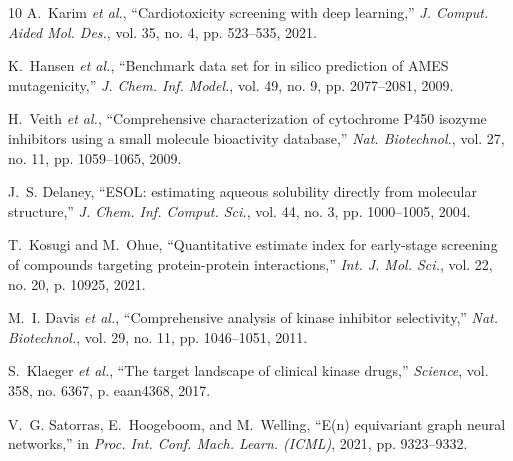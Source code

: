 \documentclass[journal]{IEEEtran}
\begin{document}
\begin{thebibliography}{10}
A.~Karim \emph{et al.}, ``Cardiotoxicity screening with deep learning,'' \emph{J. Comput. Aided Mol. Des.}, vol. 35, no. 4, pp. 523--535, 2021.

K.~Hansen \emph{et al.}, ``Benchmark data set for in silico prediction of AMES mutagenicity,'' \emph{J. Chem. Inf. Model.}, vol. 49, no. 9, pp. 2077--2081, 2009.

H.~Veith \emph{et al.}, ``Comprehensive characterization of cytochrome P450 isozyme inhibitors using a small molecule bioactivity database,'' \emph{Nat. Biotechnol.}, vol. 27, no. 11, pp. 1059--1065, 2009.

J.~S. Delaney, ``ESOL: estimating aqueous solubility directly from molecular structure,'' \emph{J. Chem. Inf. Comput. Sci.}, vol. 44, no. 3, pp. 1000--1005, 2004.

T.~Kosugi and M.~Ohue, ``Quantitative estimate index for early-stage screening of compounds targeting protein-protein interactions,'' \emph{Int. J. Mol. Sci.}, vol. 22, no. 20, p. 10925, 2021.

M.~I. Davis \emph{et al.}, ``Comprehensive analysis of kinase inhibitor selectivity,'' \emph{Nat. Biotechnol.}, vol. 29, no. 11, pp. 1046--1051, 2011.

S.~Klaeger \emph{et al.}, ``The target landscape of clinical kinase drugs,'' \emph{Science}, vol. 358, no. 6367, p. eaan4368, 2017.

V.~G. Satorras, E.~Hoogeboom, and M.~Welling, ``E(n) equivariant graph neural networks,'' in \emph{Proc. Int. Conf. Mach. Learn. (ICML)}, 2021, pp. 9323--9332.

\end{thebibliography}
\end{document}
